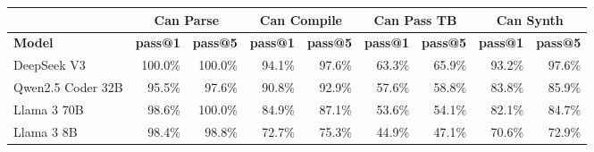 \begin{tabular}{l|rr|rr|rr|rr}
\cmidrule[\heavyrulewidth]{2-9}
 & \multicolumn{2}{c|}{\textbf{Can Parse}} & \multicolumn{2}{c|}{\textbf{Can Compile}} & \multicolumn{2}{c|}{\textbf{Can Pass TB}} & \multicolumn{2}{c}{\textbf{Can Synth}} \\
\midrule
 \textbf{Model} & \textbf{pass@1} & \textbf{pass@5} & \textbf{pass@1} & \textbf{pass@5} & \textbf{pass@1} & \textbf{pass@5} & \textbf{pass@1} & \textbf{pass@5} \\
\midrule
DeepSeek V3 & 100.0\% & 100.0\% & 94.1\% & 97.6\% & 63.3\% & 65.9\% & 93.2\% & 97.6\% \\
Qwen2.5 Coder 32B & 95.5\% & 97.6\% & 90.8\% & 92.9\% & 57.6\% & 58.8\% & 83.8\% & 85.9\% \\
Llama 3 70B & 98.6\% & 100.0\% & 84.9\% & 87.1\% & 53.6\% & 54.1\% & 82.1\% & 84.7\% \\
Llama 3 8B & 98.4\% & 98.8\% & 72.7\% & 75.3\% & 44.9\% & 47.1\% & 70.6\% & 72.9\% \\
\bottomrule
\end{tabular}